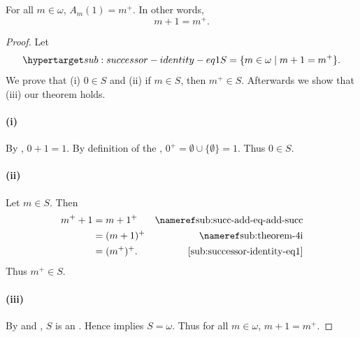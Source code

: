 \documentclass{report}
\begin{document}
\subsection{}%

\begin{lemma}[6]

  For all $m \in \omega$, $A_m(1) = m^+$.
  In other words, $$m + 1 = m^+.$$

\end{lemma}

\begin{proof}


  Let
    \begin{equation}
      \hyperlabel{sub:successor-identity-eq1}
      S = \{m \in \omega \mid m + 1 = m^+\}.
    \end{equation}
  We prove that (i) $0 \in S$ and (ii) if $m \in S$, then $m^+ \in S$.
  Afterwards we show that (iii) our theorem holds.

  \paragraph{(i)}%

    By , $0 + 1 = 1$.
    By definition of the ,
      $0^+ = \emptyset \cup \{\emptyset\} = 1$.
    Thus $0 \in S$.

  \paragraph{(ii)}%

    Let $m \in S$.
    Then
      \begin{align*}
        m^+ + 1
          & = m + 1^+ & \textref{sub:succ-add-eq-add-succ} \\
          & = (m + 1)^+ & \textref{sub:theorem-4i} \\
          & = (m^+)^+. & \eqref{sub:successor-identity-eq1}
      \end{align*}
    Thus $m^+ \in S$.

  \paragraph{(iii)}%

    By  and
      , $S$ is an
      .
    Hence  implies $S = \omega$.
    Thus for all $m \in \omega$, $m + 1 = m^+$.

\end{proof}
\end{document}
